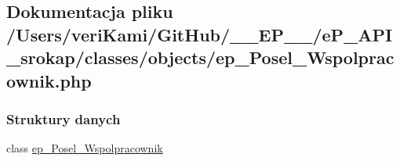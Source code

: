 \hypertarget{ep___posel___wspolpracownik_8php}{\subsection{Dokumentacja pliku /\-Users/veri\-Kami/\-Git\-Hub/\-\_\-\-\_\-\-E\-P\-\_\-\-\_\-/e\-P\-\_\-\-A\-P\-I\-\_\-srokap/classes/objects/ep\-\_\-\-Posel\-\_\-\-Wspolpracownik.php}
\label{ep___posel___wspolpracownik_8php}
}
\subsubsection*{Struktury danych}
\begin{DoxyCompactItemize}
\item 
class \hyperlink{classep___posel___wspolpracownik}{ep\-\_\-\-Posel\-\_\-\-Wspolpracownik}
\end{DoxyCompactItemize}
